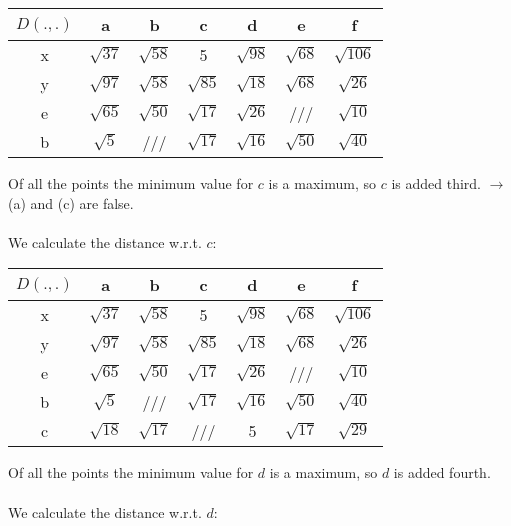 \documentclass[11pt,a4paper]{article}
\begin{document}
\begin{table}[H]
\centering
\def\arraystretch{1.2}
\begin{tabular}{|c|c|c|c|c|c|c|}
\hline 
$D(.,.)$ & a & b & c & d & e & f \\ 
\hline 
x & $\sqrt{37}$ & $\sqrt{58}$ & 5 & $\sqrt{98}$ & $\sqrt{68}$ & $\sqrt{106}$ \\ 
\hline 
y & $\sqrt{97}$ & $\sqrt{58}$ & $\sqrt{85}$ & $\sqrt{18}$ & $\sqrt{68}$ & $\sqrt{26}$ \\ 
\hline
e & $\sqrt{65}$ & $\sqrt{50}$ & $\sqrt{17}$ & $\sqrt{26}$ & /// & $\sqrt{10}$ \\
\hline
b & $\sqrt{5}$ & /// & $\sqrt{17}$ & $\sqrt{16}$ & $\sqrt{50}$ & $\sqrt{40}$ \\
\hline 
\end{tabular} 
\end{table}
\noindent
Of all the points the minimum value for $c$ is a maximum, so $c$ is added third. $\rightarrow$ (a) and (c) are false.
\\
\\
We calculate the distance w.r.t. $c$:

\begin{table}[H]
\centering
\def\arraystretch{1.2}
\begin{tabular}{|c|c|c|c|c|c|c|}
\hline 
$D(.,.)$ & a & b & c & d & e & f \\ 
\hline 
x & $\sqrt{37}$ & $\sqrt{58}$ & 5 & $\sqrt{98}$ & $\sqrt{68}$ & $\sqrt{106}$ \\ 
\hline 
y & $\sqrt{97}$ & $\sqrt{58}$ & $\sqrt{85}$ & $\sqrt{18}$ & $\sqrt{68}$ & $\sqrt{26}$ \\ 
\hline
e & $\sqrt{65}$ & $\sqrt{50}$ & $\sqrt{17}$ & $\sqrt{26}$ & /// & $\sqrt{10}$ \\
\hline
b & $\sqrt{5}$ & /// & $\sqrt{17}$ & $\sqrt{16}$ & $\sqrt{50}$ & $\sqrt{40}$ \\
\hline 
c & $\sqrt{18}$ & $\sqrt{17}$ & /// & 5 & $\sqrt{17}$ & $\sqrt{29}$ \\
\hline 
\end{tabular} 
\end{table}
\noindent
Of all the points the minimum value for $d$ is a maximum, so $d$ is added fourth. 
\\
\\
We calculate the distance w.r.t. $d$:
\end{document}
